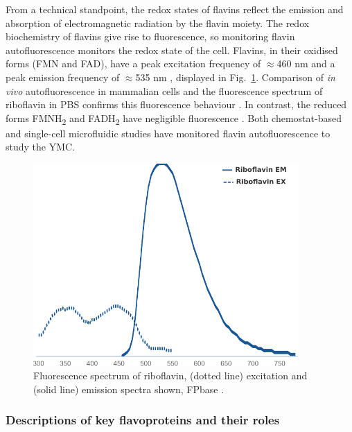 From a technical standpoint, the redox states of flavins reflect the emission and absorption of electromagnetic radiation by the flavin moiety.
The redox biochemistry of flavins give rise to fluorescence, so monitoring flavin autofluorescence monitors the redox state of the cell.
Flavins, in their oxidised forms (FMN and FAD), have a peak excitation frequency of $\approx$460 nm and a peak emission frequency of $\approx$535 nm \parencite{maslankaAutofluorescenceYeastSaccharomyces2018, wagnieresVivoFluorescenceSpectroscopy1998}, displayed in Fig.\ \ref{fig:intro-flavin-spectra}.
Comparison of \textit{in vivo} autofluorescence in mammalian cells and the fluorescence spectrum of riboflavin in PBS confirms this fluorescence behaviour \parencite{aubinAutofluorescenceViableCultured1979}.
In contrast, the reduced forms FMNH\textsubscript{2} and FADH\textsubscript{2} have negligible fluorescence \parencite{mastersConfocalRedoxImaging1994}.
Both chemostat-based \parencite{sasidharanTimeStructureYeastMetabolism2012, murrayRedoxRegulationRespiring2011} and single-cell microfluidic studies \parencite{baumgartnerFlavinbasedMetabolicCycles2018} have monitored flavin autofluorescence to study the YMC\@.

\begin{figure}
  \centering
  \includegraphics[width=0.9\textwidth]{fpbase-riboflavin-adapted}
  \caption[
    Fluorescence spectrum of riboflavin
  ]{
    Fluorescence spectrum of riboflavin, (dotted line) excitation and (solid line) emission spectra shown, FPbase \parencite{lambertUsingFPbaseFluorescent2023}.
    }
  \label{fig:intro-flavin-spectra}
\end{figure}

\subsubsection{Descriptions of key flavoproteins and their roles}
\label{subsubsec:intro-flavin-biochem-descriptions}

